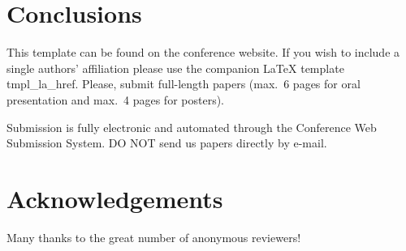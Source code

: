 \documentclass[twoside]{article}
\begin{document}
\section{Conclusions}
This template can be found on the conference website. 
If you wish to include a single authors' affiliation please use the companion LaTeX template tmpl\_la\_href. 
Please, submit full-length papers (max.~6 pages for oral presentation and max.~4 pages for posters).
 
Submission is fully electronic and automated through the Conference Web Submission System. 
DO NOT send us papers directly by e-mail. 


\section{Acknowledgements}
Many thanks to the great number of anonymous reviewers!
\end{document}
